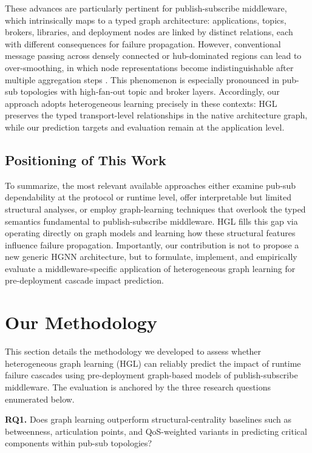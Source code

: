\documentclass[review]{elsarticle}
\begin{document}
These advances are particularly pertinent for publish-subscribe middleware, which intrinsically
maps to a typed graph architecture: applications, topics, brokers, libraries, and deployment nodes
are linked by distinct relations, each with different consequences for failure propagation.
However, conventional message passing across densely connected or hub-dominated regions can lead to
over-smoothing, in which node representations become indistinguishable after multiple aggregation
steps \cite{Li2018}. This phenomenon is especially pronounced in pub-sub topologies with
high-fan-out topic and broker layers. Accordingly, our approach adopts heterogeneous learning
precisely in these contexts: HGL preserves the typed transport-level relationships in the native
architecture graph, while our prediction targets and evaluation remain at the application level.

\subsection{Positioning of This Work}

To summarize, the most relevant available approaches either examine pub-sub dependability at the
protocol or runtime level, offer interpretable but limited structural analyses, or employ
graph-learning techniques that overlook the typed semantics fundamental to publish-subscribe
middleware. HGL fills this gap via operating directly on graph models and learning how these
structural features influence failure propagation. Importantly, our contribution is not to propose
a new generic HGNN architecture, but to formulate, implement, and empirically evaluate a
middleware-specific application of heterogeneous graph learning for pre-deployment cascade impact
prediction.

\section{Our Methodology}

This section details the methodology we developed to assess whether heterogeneous graph learning
(HGL) can reliably predict the impact of runtime failure cascades using pre-deployment graph-based
models of publish-subscribe middleware. The evaluation is anchored by the three research questions
enumerated below.

\textbf{RQ1.} Does graph learning outperform structural-centrality baselines such as betweenness,
articulation points, and QoS-weighted variants in predicting critical components within pub-sub
topologies?
\end{document}
